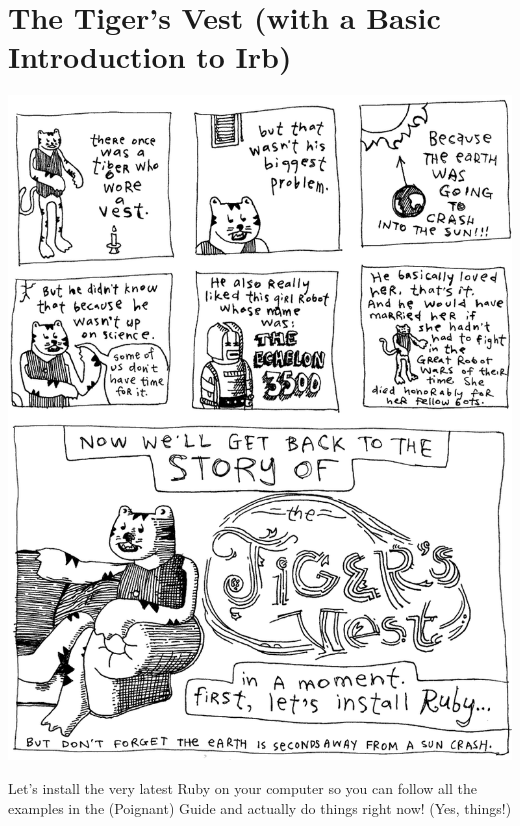 \documentclass[10pt,twoside]{report}
\begin{document}
\cleartooddpage

\appendix
\renewcommand*{\thechapter}{\Roman{chapter}}
\chapter{The Tiger's Vest (with a Basic Introduction to Irb)}
\newpage
\thispagestyle{empty}
\mbox{}
\pagebreak

\includegraphics[width=1.0\textwidth]{cache/tigersvest1.png}
\newpage

Let's install the very latest Ruby on your computer so you can follow
all the examples in the (Poignant) Guide and actually do things right
now! (Yes, things!)
\end{document}
